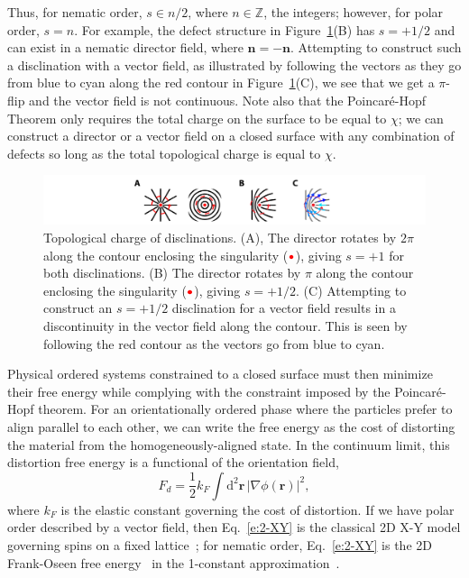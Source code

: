 Thus, for nematic order, $s \in n/2$, where $n \in \mathbb{Z}$, the integers; however, for polar order, $s = n$.
For example, the defect structure in Figure~\ref{f:1-TopCharge}(B) has $s = +1/2$ and can exist in a nematic director field, where $\mathbf{n} = \mathbf{-n}$.
Attempting to construct such a disclination with a vector field, as illustrated by following the vectors as they go from blue to cyan along the red contour in Figure~\ref{f:1-TopCharge}(C), we see that we get a $\pi$-flip and the vector field is not continuous.
Note also that the Poincar\'e-Hopf Theorem only requires the total charge on the surface to be equal to $\chi$; we can construct a director or a vector field on a closed surface with any combination of defects so long as the total topological charge is equal to $\chi$.
\begin{figure}
  \centering
  \includegraphics{figures/C1/Ch1-Figs_TopCharge.png}
  \caption{Topological charge of disclinations.
  (A), The director rotates by $2\pi$ along the contour enclosing the singularity (${\color{red} \bullet}$), giving $s = +1$ for both disclinations.
  (B) The director rotates by $\pi$ along the contour enclosing the singularity (${\color{red} \bullet}$), giving $s = +1/2$.
  (C) Attempting to construct an $s = +1/2$ disclination for a vector field results in a discontinuity in the vector field along the contour.
  This is seen by following the red contour as the vectors go from blue to cyan.}\label{f:1-TopCharge}
\end{figure}

Physical ordered systems constrained to a closed surface must then minimize their free energy while complying with the constraint imposed by the Poincar\'e-Hopf theorem.
For an orientationally ordered phase where the particles prefer to align parallel to each other, we can write the free energy as the cost of distorting the material from the homogeneously-aligned state.
In the continuum limit, this distortion free energy is a functional of the orientation field,
\begin{equation}
  F_d = \frac{1}{2} k_F \int \textrm{d}^2\mathbf{r} \, |\nabla \phi(\mathbf{r})|^2,\label{e:2-XY}
\end{equation}
where $k_F$ is the elastic constant governing the cost of distortion.
If we have polar order described by a vector field, then Eq.~\ref{e:2-XY} is the classical 2D X-Y model governing spins on a fixed lattice~\cite{RN175}; for nematic order, Eq.~\ref{e:2-XY} is the 2D Frank-Oseen free energy~\cite{RN61} in the 1-constant approximation~\cite{RN33}.

